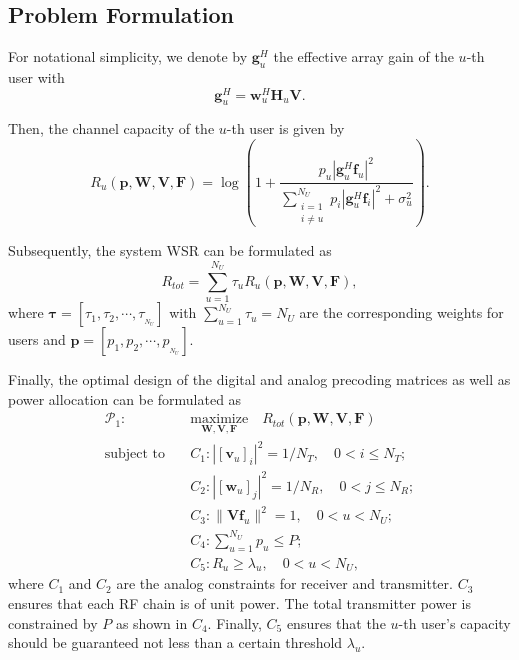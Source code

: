 \documentclass[10pt,journal,twocolumn,twoside]{IEEEtran}
\begin{document}
\subsection{Problem Formulation}
For notational simplicity, we denote by ${\bm{g}}_{u}^H$ the effective array gain of the $u$-th user with
\begin{equation}\label{eq:defgu}
{\bm{g}}_{u}^H = \bm{w}^H_u \bm{H}_u \bm{V}.
\end{equation}

Then, the channel capacity of the $u$-th user is given by
\begin{equation}\label{eq:6}
R_u(\bm{p},\bm{W},\bm{V}, \bm{F}) = \log\left(1+\frac{p_u|{\bm{g}}_{u}^H \bm{f}_u|^2}{\sum_{\substack{i=1 \\ i\neq u}}^{N_U}p_i|{\bm{g}}_{u}^H\bm{f}_i|^2+\sigma_u^2}\right).
\end{equation}

Subsequently, the system WSR can be formulated as
\begin{equation}
R_{tot}=\sum_{u=1}^{N_U} \tau_uR_u(\bm{p},\bm{W},\bm{V}, \bm{F}),
\end{equation}
where $\bm{\tau} = \left[\tau_1, \tau_2, \cdots, \tau_{_{N_U}}\right]$ with $\sum^{N_U}_{u = 1} \tau_u= N_U$ are the corresponding weights for users and $\bm{p} = [p_1, p_2, \cdots, p_{_{N_U}}]$.

Finally, the optimal design of the digital and analog precoding matrices as well as power allocation can be formulated as
\begin{align}\label{eq:maxsumrate}
\mathcal{P}_1: \quad&\underset{\bm W, \bm{V},\bm F}{\text{maximize}}\quad R_{tot}(\bm{p},\bm{W}, \bm{V}, \bm{F})\\
\text{subject to} \quad&C_1: | [\bm{v}_{u}]_i |^2=1/N_T,\quad 0<i\leq N_T; \nonumber\\
&C_2: |[\bm{w}_{u}]_j|^2=1/N_R, \quad  0<j \leq N_R;\nonumber\\
&C_3: \|\bm{V} \bm{f}_u\|^2 = 1, \quad 0<u<N_U;\nonumber\\
&C_4: \sum_{u=1}^{N_U}p_{u} \leq P;\nonumber\\
&C_5: R_{u}\geq \lambda_{u}, \quad 0<u<N_U, \nonumber
\end{align}
where $C_1$ and $C_2$ are the analog constraints for receiver and transmitter. $C_3$ ensures that each RF chain is of unit power. The total transmitter power is constrained by $P$ as shown in $C_4$. Finally, $C_5$ ensures that the $u$-th user's capacity should be guaranteed not less than a certain threshold $\lambda_{u}$.
\end{document}
